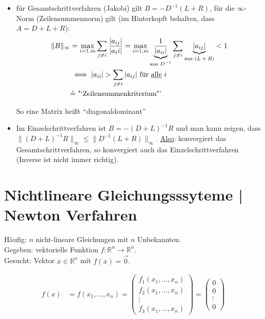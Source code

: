 \documentclass[a4paper,ngerman]{scrbook}
\newcommand{\R}{\ensuremath{\mathds{R}}}%
\begin{document}
\begin{itemize}
\item für Gesamtschrittverfahren (Jakobi) gilt $B = -D^{-1}(L+R)$, für die $\infty$-Norm (Zeilensummennorm) gilt (im Hinterkopft behalten, dass $A = D+L+R$):
\begin{align*}
  \|B\|_\infty &= \max\limits_{i=1,m} \sum_{j\neq i} \frac{|a_{ij}|}{|a_ii|} = \max\limits_{i=1,m} \underbrace{\frac{1}{|a_{ii}|}}_{\text{aus $D^{-1}$}} \sum_{j\neq i} \underbrace{|a_{ij}|}_{\text{aus $(L+R)$}} < 1\\
&\iff |a_{ii}| > \sum_{j\neq i} |a_{ij}| \text{ für \underline{alle} $i$}\\
&\hat{=} \text{ "`Zeilensummenkriterium"'}
\end{align*}

So eine Matrix heißt "`diagonaldominant"'

\item Im Einzelschrittverfahren ist $B = -(D+L)^{-1} R$ und man kann zeigen, dass $\| (D+L)^{-1} R \|_\infty \leq \|D^{-1} (L+R)\|_\infty$. \underline{Also}: konvergiert das Gesamtschrittverfahren, so konvergiert auch das Einzelschrittverfahren (Inverse ist nicht immer richtig).
\end{itemize}

\section{Nichtlineare Gleichungsssyteme | Newton Verfahren}
\label{sec:nichtlineare}

Häufig: $n$ nicht-lineare Gleichungen mit $n$ Unbekannten.\\
Gegeben: vektorielle Funktion $f\colon \R^n \to \R^n$.\\
Gesucht: Vektor $\overline{x} \in \R^n$ mit $f(\overline{x}) = \vec{0}$.

\begin{align*}
  f(x) &= f(x_1,\dots,x_n) =
  \begin{pmatrix}
    f_1(x_1,\dots,x_n)\\ f_2(x_1,\dots,x_n)\\ \vdots \\ f_3(x_1,\dots,x_n)
  \end{pmatrix} =
  \begin{pmatrix}
    0\\ 0\\ \vdots\\ 0
  \end{pmatrix}
\end{align*}
\end{document}
